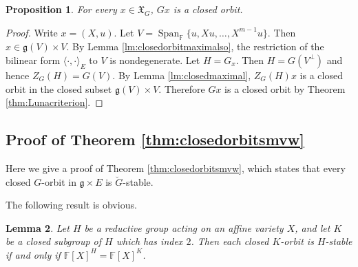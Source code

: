 \documentclass[12pt]{amsart}
\newtheorem{lm}{Lemma}[section]
\newtheorem{prop}[lm]{Proposition}
\theoremstyle{definition}
\theoremstyle{remark}\newtheorem{rmk}[lm]{Remark}
\newcommand{\Span}{\operatorname{Span}}
\newcommand{\g}{\mathfrak g}
\newcommand{\fX}{\mathfrak X}
\newcommand{\C}{\mathbb{F}}
\newcommand{\bac}{\backslash\!\!\backslash}
\begin{document}
	\begin{prop}
		\label{prop:closedorbitso}
		For every $x\in\fX_G$, $Gx$ is a closed orbit.
	\end{prop}
	\begin{proof}
		Write $x=(X,u)$. Let $V=\Span_{\C}\{u,Xu,\dots,X^{m-1}u\}$. Then $x\in\g(V)\times V$. By Lemma \ref{lm:closedorbitmaximalso}, the restriction of the bilinear form $\langle\cdot,\cdot\rangle_E$ to $V$ is nondegenerate. Let $H=G_x$. Then $H=G(V^{\bot})$ and hence $Z_G(H)=G(V)$. By Lemma \ref{lm:closedmaximal}, $Z_G(H)x$ is a closed orbit in the closed subset $\g(V)\times V$. Therefore $Gx$ is a closed orbit by Theorem \ref{thm:Lunacriterion}.
	\end{proof}
    \subsection{Proof of Theorem \ref{thm:closedorbitsmvw}}
Here we give a proof of Theorem \ref{thm:closedorbitsmvw}, which states that every closed $G$-orbit in $\g\times E$ is $\breve{G}$-stable.

The following result is obvious.

	\begin{lm}
		\label{lm:mvwclosed}
		Let $H$ be a reductive group acting on an affine variety $X$, and let $K$ be a closed subgroup of $H$ which has index $2$. Then each closed $K$-orbit is $H$-stable if and only if $\C[X]^H=\C[X]^K$.
	\end{lm}
		
\end{document}
